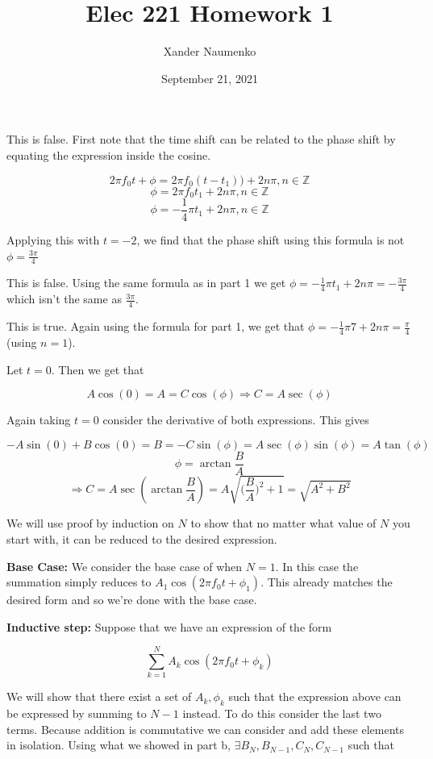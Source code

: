 \documentclass[letterpaper, reqno,11pt]{article}
\newcommand{\ZZ}{\mathbb{Z}}
\begin{document}
\title{Elec 221 Homework 1}
\date{September 21, 2021}
\author{Xander Naumenko}
\newtheorem{thm}{Theorem}
\maketitle

 This is false. First note that the time shift can be related to the phase shift by equating the expression inside the cosine. 

$$
    2\pi f_0 t+\phi=2\pi f_0(t-t_1)) + 2n\pi, n\in\ZZ
$$
$$
    \phi=2\pi f_0 t_1 + 2n\pi, n\in\ZZ
$$
$$
    \phi=-\frac14\pi t_1+2n\pi, n\in\ZZ
$$

Applying this with $t=-2$, we find that the phase shift using this formula is not $\phi=\frac{3\pi}4$

 This is false. Using the same formula as in part 1 we get $\phi=-\frac14\pi t_1+2n\pi=-\frac{3\pi}{4}$ which isn't the same as $\frac{3\pi}4$. 

 This is true. Again using the formula for part 1, we get that $\phi=-\frac14 \pi 7 + 2n\pi=\frac\pi4$ (using $n=1$). 

 Let $t=0$. Then we get that 

$$
    A\cos(0)=A=C\cos(\phi)\Rightarrow C=A\sec(\phi)
$$

Again taking $t=0$ consider the derivative of both expressions. This gives 

$$
    -A\sin(0)+B\cos(0)=B=-C\sin(\phi)=A\sec(\phi)\sin(\phi)=A\tan(\phi)
$$
$$
    \phi=\arctan{\frac BA}
$$
$$
    \Rightarrow C=A\sec(\arctan{\frac BA})=A\sqrt{\bigg(\frac BA\bigg)^2+1}=\sqrt{A^2+B^2}
$$

 We will use proof by induction on $N$ to show that no matter what value of $N$ you start with, it can be reduced to the desired expression. 

{\bf Base Case: } We consider the base case of when $N=1$. In this case the summation simply reduces to $A_1\cos(2\pi f_0 t+\phi_1)$. This already matches the desired form and so we're done with the base case. 

{\bf Inductive step: } Suppose that we have an expression of the form 

$$
    \sum_{k=1}^N A_k\cos(2\pi f_0 t + \phi_k)
$$

We will show that there exist a set of $A_k, \phi_k$ such that the expression above can be expressed by summing to $N-1$ instead. To do this consider the last two terms. Because addition is commutative we can consider and add these elements in isolation. Using what we showed in part b, $\exists B_N, B_{N-1}, C_N, C_{N-1}$ such that 
\end{document}
